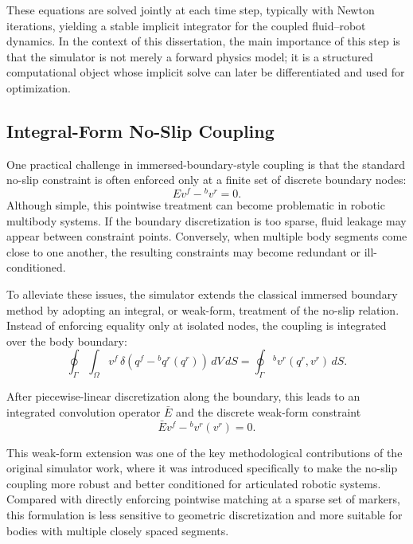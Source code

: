 These equations are solved jointly at each time step, typically with Newton iterations, yielding a stable implicit integrator for the coupled fluid--robot dynamics. In the context of this dissertation, the main importance of this step is that the simulator is not merely a forward physics model; it is a structured computational object whose implicit solve can later be differentiated and used for optimization.

\subsection{Integral-Form No-Slip Coupling}

One practical challenge in immersed-boundary-style coupling is that the standard no-slip constraint is often enforced only at a finite set of discrete boundary nodes:
\begin{equation}
Ev^f - {}^b v^r = 0.
\label{eq:thesis_classic_ibm}
\end{equation}
Although simple, this pointwise treatment can become problematic in robotic multibody systems. If the boundary discretization is too sparse, fluid leakage may appear between constraint points. Conversely, when multiple body segments come close to one another, the resulting constraints may become redundant or ill-conditioned.

To alleviate these issues, the simulator extends the classical immersed boundary method by adopting an integral, or weak-form, treatment of the no-slip relation. Instead of enforcing equality only at isolated nodes, the coupling is integrated over the body boundary:
\begin{equation}
\oint_{\Gamma} \int_{\Omega}
v^f \, \delta(q^f - {}^b q^r(q^r)) \, dV\, dS
=
\oint_{\Gamma} {}^b v^r(q^r,v^r)\, dS .
\label{eq:thesis_weak_ibm_cont}
\end{equation}

After piecewise-linear discretization along the boundary, this leads to an integrated convolution operator $\bar{E}$ and the discrete weak-form constraint
\begin{equation}
\bar{E}v^f - {}^b v^r(v^r) = 0.
\label{eq:thesis_weak_ibm_disc}
\end{equation}

This weak-form extension was one of the key methodological contributions of the original simulator work, where it was introduced specifically to make the no-slip coupling more robust and better conditioned for articulated robotic systems. Compared with directly enforcing pointwise matching at a sparse set of markers, this formulation is less sensitive to geometric discretization and more suitable for bodies with multiple closely spaced segments.

